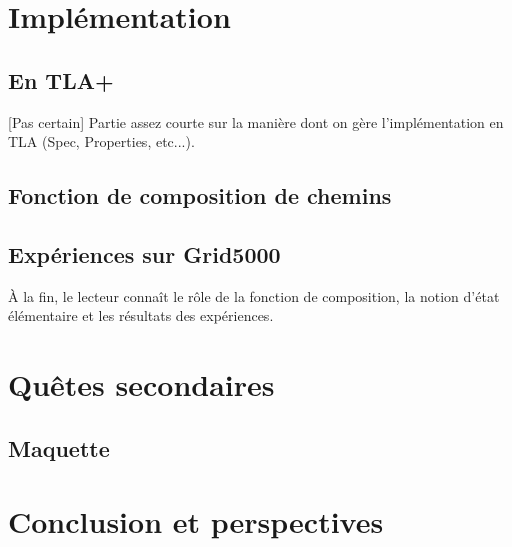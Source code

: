 \documentclass{article}
\begin{document}
\section{Implémentation}
    \subsection{En TLA+}
    [Pas certain] Partie assez courte sur la manière dont on gère l'implémentation en TLA (Spec, Properties, etc...).
    \subsection{Fonction de composition de chemins}
    \subsection{Expériences sur Grid5000}
    À la fin, le lecteur connaît le rôle de la fonction de composition, la notion d'état élémentaire 
    et les résultats des expériences. 

\section{Quêtes secondaires}
    \subsection{Maquette}

\section{Conclusion et perspectives}
\end{document}
